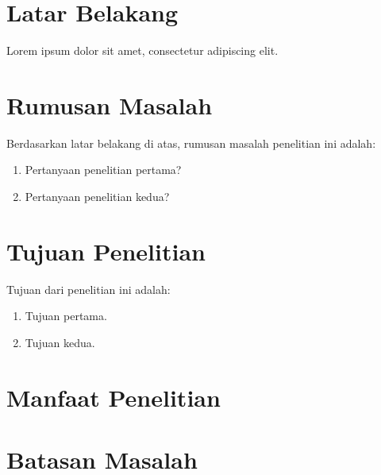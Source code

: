 

\section{Latar Belakang}


Lorem ipsum dolor sit amet, consectetur adipiscing elit.

\section{Rumusan Masalah}


Berdasarkan latar belakang di atas, rumusan masalah penelitian ini adalah:
\begin{enumerate}
  \item Pertanyaan penelitian pertama?
  \item Pertanyaan penelitian kedua?
\end{enumerate}

\section{Tujuan Penelitian}


Tujuan dari penelitian ini adalah:
\begin{enumerate}
  \item Tujuan pertama.
  \item Tujuan kedua.
\end{enumerate}

\section{Manfaat Penelitian}


\section{Batasan Masalah}

